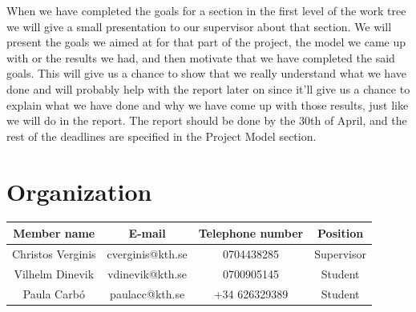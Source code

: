 \documentclass{article}
\begin{document}
\begin{itemize}
		\vspace{2em}
		 When we have completed the goals for a section in the first level of the work tree we will give a small presentation to our supervisor about that section. We will present the goals we aimed at for that part of the project, the model we came up with or the results we had, and then motivate that we have completed the said goals. This will give us a chance to show that we really understand what we have done and will probably help with the report later on since it'll give us a chance to explain what we have done and why we have come up with those results, just like we will do in the report. The report should be done by the 30th of April, and the rest of the deadlines are specified in the Project Model section.
	\end{itemize}
	\vspace{2em}
	\section{Organization}
	\begin{center}
		\begin{tabular}{|c|c|c|c|} \hline
			Member name & E-mail & Telephone number & Position \\ \hline
			Christos Verginis & cverginis@kth.se & 0704438285 & Supervisor \\ \hline
			Vilhelm Dinevik & vdinevik@kth.se & 0700905145 & Student\\ \hline
			Paula Carbó & paulacc@kth.se & +34 626329389 & Student\\ \hline
		\end{tabular}
	\end{center}
	\newpage
	
	
	
\end{document}
